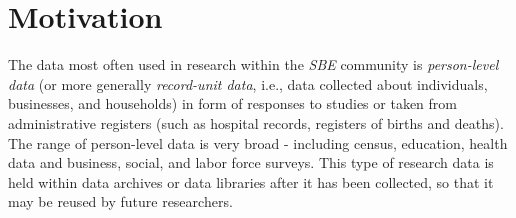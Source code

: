 \documentclass{llncs}
\begin{document}

\section{Motivation}
\label{motivation}

The data most often used in research within the \emph{SBE} community is \emph{person-level data} (or more generally \emph{record-unit data}, i.e., data collected about individuals, businesses, and households) in form of responses to studies or taken from administrative registers
(such as hospital records, registers of births and deaths). 
The range of person-level data is very broad - 
including census, education, health data and business, social, and labor force surveys.  
This type of research data is
held within data archives or data libraries after it has been collected, so that it may be
reused by future researchers. 
\end{document}
